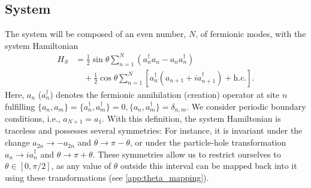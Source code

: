 \documentclass[aps,prx,twocolumn,superscriptaddress,nofootinbib,nolongbibliography,nobalancelastpage,10pt,floatfix]{revtex4-2}
\begin{document}
\subsection{System}
\label{subsec:sys_model}

The system will be composed of an even number, $N$, of fermionic modes, with the system Hamiltonian
\begin{align}
    H_S &= \frac{1}{2} \sin\theta \sum_{n=1}^N (a_n^\dagger a_n - a_n a_n^\dagger) \nonumber\\
        &\quad + \frac{1}{2} \cos\theta \sum_{n=1}^N \left[a_n^\dagger (a_{n+1} + i a_{n+1}^\dagger) + \text{h.c.}\right].
    \label{eq:system_hamiltonian_realspace}
\end{align}
Here, $a_n$ ($a_n^\dag$) denotes the fermionic annihilation (creation) operator at site $n$ fulfilling $\{a_n,a_m\}=\{a_n^\dagger,a_m^\dagger\}=0, \{a_n,a_m^\dagger\}=\delta_{n,m}$. We consider periodic boundary conditions, i.e., $a_{N+1} = a_{1}$. With this definition, the system Hamiltonian is traceless and possesses several symmetries: For instance, it is invariant under the change $a_{2n}\to -a_{2n}$ and $\theta\to \pi-\theta$, or under the particle-hole transformation $a_n\to i a_n^\dagger$ and $\theta\to \pi+\theta$. These symmetries allow us to restrict ourselves to $\theta\in [0,\pi/2]$, as any value of $\theta$ outside this interval can be mapped back into it using these transformations (see \cref{app:theta_mapping}).
\end{document}
